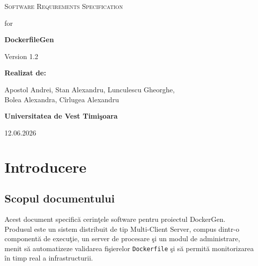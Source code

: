 \documentclass[12pt, a4paper]{article}
\begin{document}
\begin{titlepage}
    \centering
    \vspace*{1cm}
    {\scshape\LARGE Software Requirements Specification\par}
    \vspace{0.5cm}
    {\large for\par}
    \vspace{0.5cm}
    {\Huge\bfseries DockerfileGen\par}
    \vspace{1.5cm}
    {\Large Version 1.2\par}
    \vspace{1cm}
    {\bfseries Realizat de:\par}
    Apostol Andrei, Stan Alexandru, Lunculescu Gheorghe,\\
    Bolea Alexandra, C\^{i}rlugea Alexandru\par
    \vspace{1cm}
    {\bfseries Universitatea de Vest Timi\c{s}oara\par}
    \vspace{0.5cm}
    {\large 12.06.2026\par}
\end{titlepage}

\tableofcontents
\newpage

\section{Introducere}

\subsection{Scopul documentului}

Acest document specific\u{a} cerin\c{t}ele software pentru proiectul DockerGen. Produsul este un sistem
distribuit de tip Multi-Client Server, compus dintr-o component\u{a} de execu\c{t}ie, un server de procesare
\c{s}i un modul de administrare, menit s\u{a} automatizeze validarea fi\c{s}ierelor \texttt{Dockerfile} \c{s}i s\u{a} permit\u{a}
monitorizarea \^{i}n timp real a infrastructurii.
\end{document}
